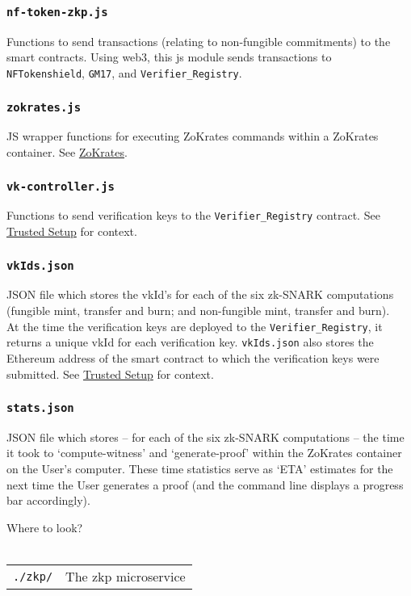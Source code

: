 \subsubsection{\texttt{nf-token-zkp.js}}
\label{sec:nf-token-zkp}
Functions to send transactions (relating to non-fungible commitments) to the smart contracts. Using web3, this js module sends transactions to \texttt{NFTokenshield}, \texttt{GM17}, and \texttt{Verifier\_Registry}.

\subsubsection{\texttt{zokrates.js}}
JS wrapper functions for executing ZoKrates commands within a ZoKrates container. See \hyperref[sec:zokrates]{ZoKrates}.

\subsubsection{\texttt{vk-controller.js}}
Functions to send verification keys to the \texttt{Verifier\_Registry} contract. See \hyperref[sec:trustedSetup]{Trusted Setup} for context.

\subsubsection{\texttt{vkIds.json}}
JSON file which stores the vkId's for each of the six zk-SNARK computations (fungible mint, transfer and burn; and non-fungible mint, transfer and burn).\\
At the time the verification keys are deployed to the \texttt{Verifier\_Registry}, it returns a unique vkId for each verification key. \texttt{vkIds.json} also stores the Ethereum address of the smart contract to which the verification keys were submitted. See \hyperref[sec:trustedSetup]{Trusted Setup} for context.

\subsubsection{\texttt{stats.json}}
JSON file which stores -- for each of the six zk-SNARK computations -- the time it took to `compute-witness' and `generate-proof' within the ZoKrates container on the User's computer. These time statistics serve as `ETA' estimates for the next time the User generates a proof (and the command line displays a progress bar accordingly).

\begin{center}
  \begin{mdframed}[backgroundcolor=verylightblue]
    Where to look?\\
    \\
    \begin{tabular}{lp{14cm}}
      \texttt{./zkp/} & The zkp microservice\\
    \end{tabular}
  \end{mdframed}
\end{center}


